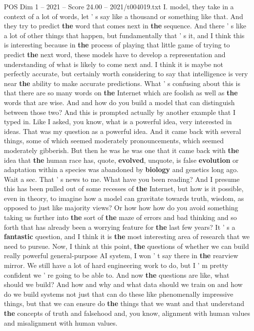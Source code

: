 \begin{textsample}{POS Dim 1 – 2021 – Score 24.00 – 2021/t004019.txt}
I. model, they take in a context of a lot of words, let ' s say like a thousand or something like that.
And they try to predict \textbf{the} word that comes next in \textbf{the} sequence.
And there ' s like a lot of other things that happen, but fundamentally that ' s it, and I think this is interesting because in \textbf{the} process of playing that little game of trying to predict \textbf{the} next word, these models have to develop a representation and understanding of what is likely to come next and.
I think it is maybe not perfectly accurate, but certainly worth considering to say that intelligence is very near \textbf{the} ability to make accurate predictions.
What ' s confusing about this is that there are so many words on \textbf{the} Internet which are foolish as well as \textbf{the} words that are wise.
And and how do you build a model that can distinguish between those two?
And this is prompted actually by another example that I typed in.
Like I asked, you know, what is a powerful idea, very interested in ideas.
That was my question as a powerful idea.
And it came back with several things, some of which seemed moderately pronouncements, which seemed moderately gibberish.
But then he was he was one that it came back with \textbf{the} idea that \textbf{the} human race has, quote, \textbf{evolved}, unquote, is false \textbf{evolution} or adaptation within a species was abandoned by \textbf{biology} and genetics long ago.
Wait a sec.
That ' s news to me.
What have you been reading?
And I presume this has been pulled out of some recesses of \textbf{the} Internet, but how is it possible, even in theory, to imagine how a model can gravitate towards truth, wisdom, as opposed to just like majority views?
Or how how how do you avoid something taking us further into \textbf{the} sort of \textbf{the} maze of errors and bad thinking and so forth that has already been a worrying feature for \textbf{the} last few years?
It ' s a \textbf{fantastic} question, and I think it is \textbf{the} most interesting area of research that we need to pursue.
Now, I think at this point, \textbf{the} questions of whether we can build really powerful general-purpose AI system, I won ' t say there in \textbf{the} rearview mirror.
We still have a lot of hard engineering work to do, but I ' m pretty confident we ' re going to be able to.
And now \textbf{the} questions are like, what should we build?
And how and why and what data should we train on and how do we build systems not just that can do these like phenomenally impressive things, but that we can ensure do \textbf{the} things that we want and that understand \textbf{the} concepts of truth and falsehood and, you know, alignment with human values and misalignment with human values.

\end{textsample}
